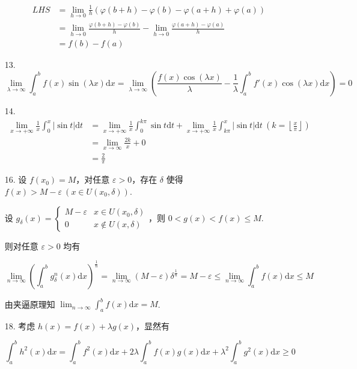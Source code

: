 \documentclass[oneside]{ctexbook} %
\begin{document}
\begin{enumerate}
    $$
    \begin{aligned}
        LHS &= \lim_{h \to 0} \frac 1 h \left( \varphi(b+h) - \varphi(b) - \varphi(a+h) + \varphi(a) \right) \\
        &= \lim_{h \to 0} \frac {\varphi(b+h) - \varphi(b)} h - \lim_{h \to 0} \frac {\varphi(a+h) - \varphi(a)} h \\
        &= f(b) - f(a)
    \end{aligned}
    $$
    \item[13.]
    $$
    \lim_{\lambda \to \infty} \int_a^b f(x) \sin(\lambda x) \mathrm dx = \lim_{\lambda \to \infty} \left( \frac {f(x) \cos(\lambda x)} \lambda - \frac 1 \lambda \int_a^b f'(x) \cos(\lambda x) \mathrm dx \right) = 0
    $$
    \item[14.]
    $$
    \begin{aligned}
        \lim_{x \to +\infty} \frac 1 x \int_0^{x} |\sin t| \mathrm dt &= \lim_{x \to +\infty} \frac 1 x \int_0^{k\pi} \sin t \mathrm dt + \lim_{x \to +\infty} \frac 1 x \int_{k\pi}^x |\sin t| \mathrm dt \ \left( k = \left\lfloor \frac x \pi \right\rfloor \right) \\
        &= \lim_{x \to \infty} \frac {2k} x + 0 \\
        &= \frac 2 \pi
    \end{aligned}
    $$
    \item[16.]
    设 $f(x_0) = M$，对任意 $\varepsilon > 0$，存在 $\delta$ 使得 $f(x) > M - \varepsilon \ \left(x \in U(x_0, \delta) \right)$.
    
    设 $g_\delta(x) = \begin{cases} M - \varepsilon & x \in U(x_0, \delta) \\ 0 & x \not\in U(x, \delta) \end{cases}$，则 $0 < g(x) < f(x) \leqslant M$.
    
    则对任意 $\varepsilon > 0$ 均有
    
    $$
    \lim_{n \to \infty} \left( \int_a^b g_\delta^n(x) \mathrm dx \right)^{\frac 1 n} = \lim_{n \to \infty} (M - \varepsilon) \delta^{\frac 1 n} = M - \varepsilon \leqslant \lim_{n \to \infty} \int_a^b f(x) \mathrm dx \leqslant M
    $$
    
    由夹逼原理知 $\displaystyle \lim_{n \to \infty} \int_a^b f(x) \mathrm dx = M$.
    \item[18.]
    考虑 $h(x) = f(x) + \lambda g(x)$，显然有
    
    $$
    \int_a^b h^2(x) \mathrm dx = \int_a^b f^2(x) \mathrm dx + 2\lambda \int_a^b f(x)g(x) \mathrm dx + \lambda^2 \int_a^b g^2(x) \mathrm dx \geqslant 0
    $$
    

\end{enumerate}
\end{document}

